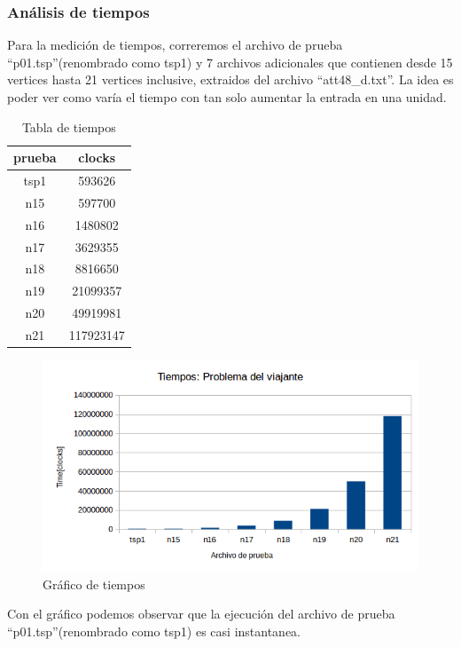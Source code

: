 \subsubsection{Análisis de tiempos}
Para la medición de tiempos, correremos el archivo de prueba ``p01.tsp''(renombrado como tsp1) y 7 archivos adicionales que contienen desde 15 vertices hasta 21 vertices inclusive, 
extraidos del archivo
``att48\_d.txt''.
La idea es poder ver como varía el tiempo con tan solo aumentar la entrada en una unidad.
\begin{table}[H]
\centering
\begin{tabular}{|c|c|}
\hline
\textbf{prueba} & \textbf{clocks} \\ \hline
tsp1            & 593626          \\ \hline
n15             & 597700          \\ \hline
n16             & 1480802         \\ \hline
n17             & 3629355         \\ \hline
n18             & 8816650         \\ \hline
n19             & 21099357        \\ \hline
n20             & 49919981        \\ \hline
n21             & 117923147       \\ \hline
\end{tabular}
\caption{Tabla de tiempos}
\end{table}

\begin{figure}[H]
\centering
\includegraphics[width=\textwidth]{ProblemaDelViajante/tiempos.png}
\caption{Gráfico de tiempos}
\end{figure}

Con el gráfico podemos observar que la ejecución del archivo de prueba ``p01.tsp''(renombrado como tsp1) es casi instantanea.


